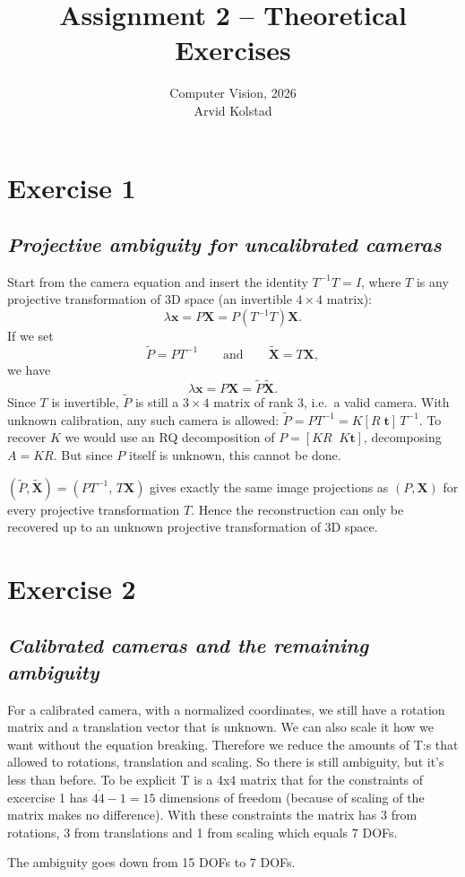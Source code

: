 \documentclass[11pt,a4paper]{article}
\title{Assignment 2 -- Theoretical Exercises}
\author{Computer Vision, 2026 \\ Arvid Kolstad}
\date{}
\newcommand{\vb}[1]{\mathbf{#1}}
\newcommand{\exercise}[1]{
\section*{Exercise #1}}
\newcommand{\task}[2]{
\subsection*{#1\quad\normalfont\textit{#2}}}
\begin{document}
\maketitle

\exercise{1}

\task{}{Projective ambiguity for uncalibrated cameras}

Start from the camera equation and insert the identity $T^{-1}T = I$,
where $T$ is any
projective transformation of 3D space (an invertible $4\times 4$ matrix):
\[
    \lambda\vb{x} = P\vb{X} = P\left(T^{-1}T\right)\vb{X}.
\]
If we set
\[
    \tilde{P} = PT^{-1} \qquad\text{and}\qquad \tilde{\vb{X}} = T\vb{X},
\]
we have
\[
    \lambda\vb{x} = P\vb{X} = \tilde{P}\tilde{\vb{X}}.
\]
Since $T$ is invertible, $\tilde{P}$ is still a $3\times 4$ matrix of
rank 3, i.e.\ a valid camera.
With unknown calibration, any such camera is allowed:
$\tilde{P} = PT^{-1} = K[R\;\vb{t}]\,T^{-1}$. To recover $K$ we would
use an RQ decomposition
of $P = [KR\;\;K\vb{t}]$, decomposing $A = KR$. But since $P$ itself
is unknown, this cannot be done.
\begin{answer}
    $(\tilde{P}, \tilde{\vb{X}}) = (PT^{-1},\, T\vb{X})$ gives
    exactly the same image projections as
    $(P, \vb{X})$ for every projective transformation $T$. Hence the
    reconstruction can only be
    recovered up to an unknown projective transformation of 3D space.
\end{answer}

\exercise{2}

\task{}{Calibrated cameras and the remaining ambiguity}

For a calibrated camera, with a normalized coordinates, we still
have a rotation matrix and a translation vector that is unknown.
We can also scale it how we want without the equation breaking. Therefore
we reduce the amounts of T:s that allowed to rotations,
translation and scaling. So there is still ambiguity, but it's less
than before. To be explicit T is a 4x4 matrix that for the
constraints of excercise 1 has $4 \dot 4 -1 =
15$ dimensions of freedom (because of scaling of the matrix makes no
difference). With these constraints the matrix has 3 from rotations,
3 from translations and 1 from scaling which equals 7 DOFs.

\begin{answer}
    The ambiguity goes down from 15 DOFs to 7 DOFs.
\end{answer}
\end{document}
